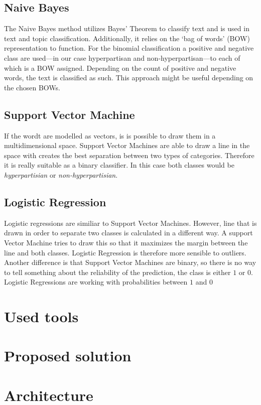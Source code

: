 \documentclass{article}
\begin{document}
\subsection{Naive Bayes}
The Naive Bayes method utilizes Bayes' Theorem to classify text and is used in text and topic classification.
Additionally, it relies on the `bag of words' (BOW) representation to function.
For the binomial classification a positive and negative class are used---in our case hyperpartisan and non-hyperpartisan---to each of which is a BOW assigned.
Depending on the count of positive and negative words, the text is classified as such.
This approach might be useful depending on the chosen BOWs.
\subsection{Support Vector Machine}

If the wordt are modelled as vectors, is is possible to draw them in a multidimensional space. Support Vector Machines are able to draw a line in the space with creates the best separation between two types of categories. Therefore it is really suitable as a binary classifier. In this case both classes would be \textit{hyperpartisian} or \textit{non-hyperpartisian}.

\subsection{Logistic Regression}

Logistic regressions are similiar to Support Vector Machines. However, line that is drawn in order to separate two classes is calculated in a different way. A support Vector Machine tries to draw this so that it maximizes the margin between the line and both classes. Logistic Regression is therefore more sensible to outliers. Another difference is that Support Vector Machines are binary, so there is no way to tell something about the reliability of the prediction, the class is either $1$ or $0$. Logistic Regressions are working with probabilities between $1$ and $0$

\section{Used tools}

\section{Proposed solution}

\section{Architecture}
\end{document}
